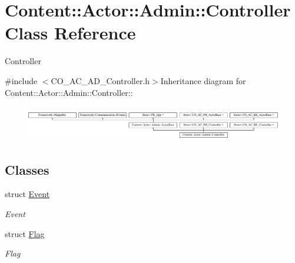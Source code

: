 \hypertarget{classContent_1_1Actor_1_1Admin_1_1Controller}{
\section{Content::Actor::Admin::Controller Class Reference}
\label{classContent_1_1Actor_1_1Admin_1_1Controller}
}


Controller  


{\ttfamily \#include $<$CO\_\-AC\_\-AD\_\-Controller.h$>$}Inheritance diagram for Content::Actor::Admin::Controller::\begin{figure}[H]
\begin{center}
\leavevmode
\includegraphics[height=1.54839cm]{classContent_1_1Actor_1_1Admin_1_1Controller}
\end{center}
\end{figure}
\subsection*{Classes}
\begin{DoxyCompactItemize}
\item 
struct \hyperlink{structContent_1_1Actor_1_1Admin_1_1Controller_1_1Event}{Event}
\begin{DoxyCompactList}\small\item\em Event \item\end{DoxyCompactList}\item 
struct \hyperlink{structContent_1_1Actor_1_1Admin_1_1Controller_1_1Flag}{Flag}
\begin{DoxyCompactList}\small\item\em Flag \item\end{DoxyCompactList}\end{DoxyCompactItemize}
